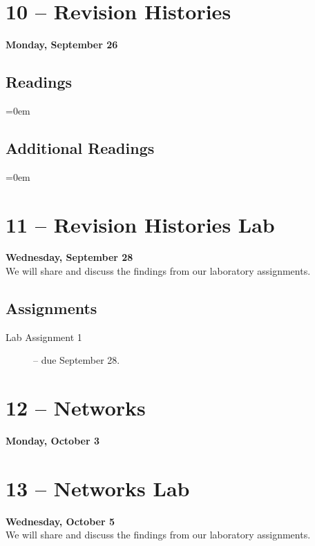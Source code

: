 \documentclass[11pt]{memoir}
\newenvironment{readinglist}{
\begin{list}{}{\leftmargin=8pt \itemindent=0em}
  \setlength{\itemsep}{8pt}
  \setlength{\parskip}{0em}
  \setlength{\parsep}{1em}
  \setlength{\parindent}{8em}}
{\end{list}}
\begin{document}
\section{10 -- Revision Histories}
\textcolor{CUGold}{\textbf{Monday, September 26}}\\

    \subsection{Readings}
    \begin{readinglist}
        \item {}
        \item {}
    \end{readinglist}
    
    \subsection{Additional Readings}
    \begin{readinglist}
        \item {}
    \end{readinglist}

\section{11 -- Revision Histories Lab}
\textcolor{CUGold}{\textbf{Wednesday, September 28}}\\
We will share and discuss the findings from our laboratory assignments.

    \subsection{Assignments}
    \begin{description}%
        \item[Lab Assignment 1 ] -- due September 28. 
    \end{description}

\section{12 -- Networks}
\textcolor{CUGold}{\textbf{Monday, October 3}}\\

\section{13 -- Networks Lab}
\textcolor{CUGold}{\textbf{Wednesday, October 5}}\\
We will share and discuss the findings from our laboratory assignments.
\end{document}
